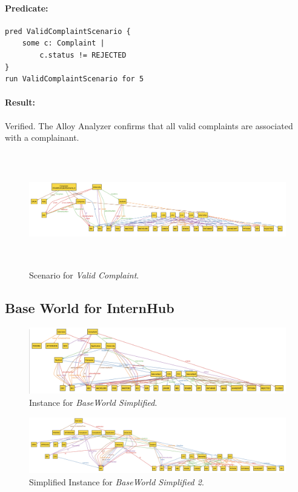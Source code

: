 \paragraph{Predicate:}
\begin{verbatim}
pred ValidComplaintScenario {
    some c: Complaint |
        c.status != REJECTED
}
run ValidComplaintScenario for 5
\end{verbatim}
\paragraph{Result:} Verified. The Alloy Analyzer confirms that all valid complaints are associated with a complainant.


\begin{figure}[H]
    \centering
    \includegraphics[width=1\linewidth, height=5cm]{JhaBhatiaSharma/Images/Scenario 3.png}
    \caption{Scenario for \textit{Valid Complaint}.}
    \label{fig:scenario3}
\end{figure}

\subsection{Base World for InternHub}
\begin{figure}[H]
    \centering
    \includegraphics[width=1.2\linewidth]{JhaBhatiaSharma/Images/BaseWorld1.png}
    \caption{Instance for \textit{BaseWorld Simplified}.}
    \label{fig:baseWorld}
\end{figure}

\begin{figure}[H]
    \centering
    \includegraphics[width=1\linewidth]{JhaBhatiaSharma/Images/BaseWorld2.png}
    \caption{Simplified Instance for \textit{BaseWorld Simplified 2}.}
    \label{fig:baseWorld_magic}
\end{figure}

